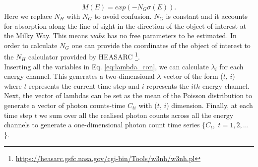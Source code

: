 \documentclass{aa}
\begin{document}
\begin{equation}
M(E) = exp(-N_G\sigma(E)).
\end{equation}
Here we replace $N_H$ with $N_G$ to avoid confusion. $N_G$ is constant and it accounts for absorption along the line of sight in the direction of the object of interest at the Milky Way. This means $wabs$ has no free parameters to be estimated. In order to calculate $N_G$ one can provide the coordinates of the object of interest to the $N_H$ calculator provided by HEASARC \footnote{\url{https://heasarc.gsfc.nasa.gov/cgi-bin/Tools/w3nh/w3nh.pl}}. \\
Inserting all the variables in Eq. \ref{eq:lambda_con}, we can calculate $\lambda_i$ for each energy channel. This generates a two-dimensional $\lambda$ vector of the form ($t$, $i$) where $t$ represents the current time step and $i$ represents the $ith$ energy channel. Next, the vector of lambdas can be set as the mean of the Poisson distribution to generate a vector of photon counts-time $C_{ti}$ with ($t$, $i$) dimension. Finally, at each time step $t$ we sum over all the realised photon counts across all the energy channels to generate a one-dimensional photon count time series \{$C_t,$ $t = 1,2,\ldots$\}. \\
\end{document}
